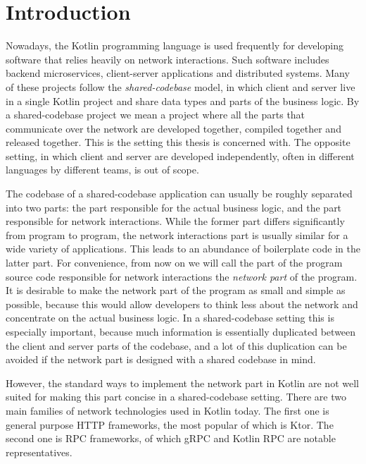 \documentclass[a4paper,11pt,oneside]{article}
\newcommand{\term}[1]{\textit{#1}}
\begin{document}
\newpage
\tableofcontents

\clearpage
{}

\section{Introduction}

Nowadays, the Kotlin programming language is used frequently for developing software that relies
heavily on network interactions. Such software includes backend microservices, client-server
applications and distributed systems. Many of these projects follow the \term{shared-codebase} model, in
which client and server live in a single Kotlin project and share data types and parts of the business
logic. By a shared-codebase project we mean a project where all the parts that communicate over the
network are developed together, compiled together and released together. This is the setting this
thesis is concerned with. The opposite setting, in which client and server are developed
independently, often in different languages by different teams, is out of scope.

The codebase of a shared-codebase application can usually be roughly separated into two parts:
the part responsible for the actual business logic, and the part responsible for network interactions. While
the former part differs significantly from program to program, the network interactions part is usually
similar for a wide variety of applications. This leads to an abundance of boilerplate code
in the latter part. For convenience, from now on we will call the part of the program source code
responsible for network interactions the \term{network part} of the program. It is desirable to make the
network part of the program as small and simple as possible, because this would allow developers
to think less about the network and concentrate on the actual business logic. In a shared-codebase
setting this is especially important, because much information is essentially duplicated between
the client and server parts of the codebase, and a lot of this duplication can be avoided if the
network part is designed with a shared codebase in mind.

However, the standard ways to implement the network part in Kotlin are not well suited for making this part
concise in a shared-codebase setting. There are two main families of network technologies used in
Kotlin today. The first one is general purpose HTTP frameworks, the most popular of which is Ktor.
The second one is RPC frameworks, of which gRPC and Kotlin RPC are notable representatives.
\end{document}
